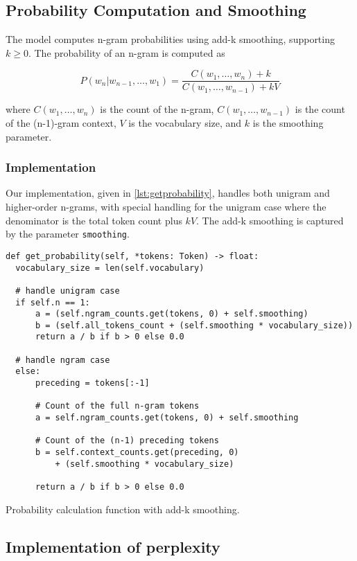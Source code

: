 \documentclass[a4paper]{article}
\begin{document}
\subsection{Probability Computation and Smoothing}
The model computes n-gram probabilities using add-k smoothing, supporting \(k \ge 0\). The probability of an n-gram is computed as

\[
  P(w_n | w_{n-1}, \ldots, w_1) = \frac{C(w_1, \ldots, w_n) + k}{C(w_1, \ldots, w_{n-1}) + kV}
\]

where \(C(w_1, \ldots, w_n)\) is the count of the n-gram, \(C(w_1, \ldots, w_{n-1})\) is the count of the (n-1)-gram context, \(V\) is the vocabulary size, and \(k\) is the smoothing parameter.
\subsubsection{Implementation}
Our implementation, given in \ref{lst:getprobability}, handles both unigram and higher-order n-grams, with special handling for the unigram case where the denominator is the total token count plus \(kV\). The add-k smoothing is captured by the parameter \texttt{smoothing}.

\begin{listing}[H]
  \begin{verbatim}
def get_probability(self, *tokens: Token) -> float:
  vocabulary_size = len(self.vocabulary)
  
  # handle unigram case
  if self.n == 1:
      a = (self.ngram_counts.get(tokens, 0) + self.smoothing)
      b = (self.all_tokens_count + (self.smoothing * vocabulary_size))
      return a / b if b > 0 else 0.0
  
  # handle ngram case
  else:
      preceding = tokens[:-1]

      # Count of the full n-gram tokens
      a = self.ngram_counts.get(tokens, 0) + self.smoothing
      
      # Count of the (n-1) preceding tokens
      b = self.context_counts.get(preceding, 0)
          + (self.smoothing * vocabulary_size)

      return a / b if b > 0 else 0.0
\end{verbatim}
  \caption{Probability calculation function with add-k smoothing.}
  \label{lst:getprobability}
\end{listing}


\subsection{Implementation of perplexity}
\end{document}
